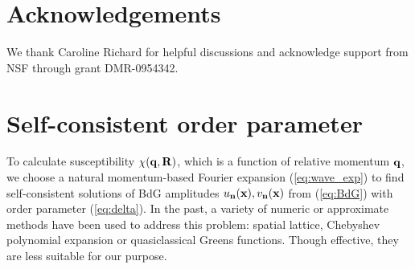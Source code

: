 \documentclass[prb,aps,showpacs,amsmath,twocolumn,10pt]{revtex4-1}
\begin{document}

\section{Acknowledgements}

We thank Caroline Richard for helpful discussions and 
acknowledge support from NSF through grant DMR-0954342. 



\appendix*

\section{Self-consistent order parameter}
\label{app:self-cons}

To calculate susceptibility $\chi({\bf q},{\bf R})$, which is a function
of relative momentum ${\bf q}$, we choose a natural momentum-based Fourier
expansion (\ref{eq:wave_exp}) to find 
self-consistent solutions of BdG amplitudes $u_{\bf n}({\bf x}),v_{\bf n}({\bf x})$ from (\ref{eq:BdG}) with order parameter
(\ref{eq:delta}). 
In the past, a variety of numeric or approximate
methods have been used to address this problem:
spatial lattice\cite{Marcin2009, PhysRevB.57.8709, PhysRevLett.80.4763},
Chebyshev polynomial expansion\cite{PhysRevLett.105.167006} or
quasiclassical Greens functions.\cite{Burkhardt1994, Vorontsov2005fflo} 
Though effective, they are less suitable for our purpose.
\end{document}
